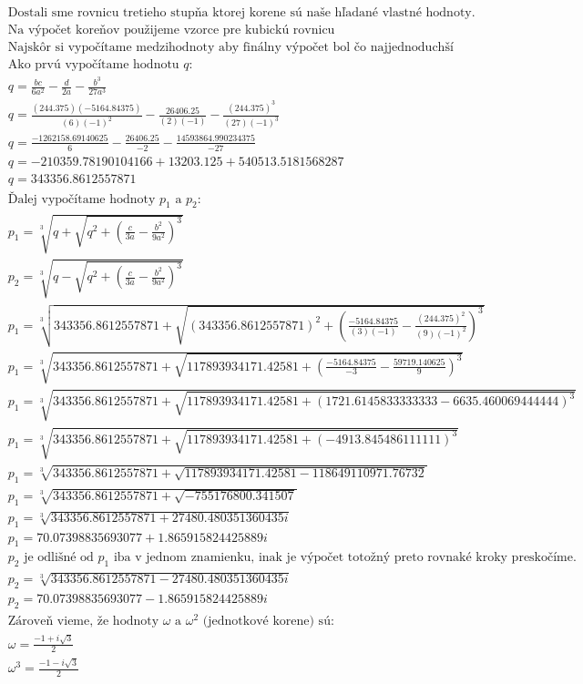 \documentclass[a4paper]{article}
\begin{document}
	\begin{align*}
		&\text{Dostali sme rovnicu tretieho stupňa ktorej korene sú naše hľadané vlastné hodnoty.}
		\\
		&\text{Na výpočet koreňov použijeme vzorce pre kubickú rovnicu}
		\\
		&\text{Najskôr si vypočítame medzihodnoty aby finálny výpočet bol čo najjednoduchší}
		\\
		&\text{Ako prvú vypočítame hodnotu $q$:}
		\\
		&q=\frac{bc}{6a^2}-\frac{d}{2a}-\frac{b^3}{27a^3}
		\\
		&q=\frac{(244.375)(-5164.84375)}{(6)(-1)^2}-\frac{26406.25}{(2)(-1)}-\frac{(244.375)^3}{(27)(-1)^3}
		\\
		&q=\frac{-1262158.69140625}{6}-\frac{26406.25}{-2}-\frac{14593864.990234375}{-27}
		\\
		&q=-210359.78190104166+13203.125+540513.5181568287
		\\
		&q=343356.8612557871
		\\
		&\text{Ďalej vypočítame hodnoty $p_1$ a $p_2$:}
		\\
		&p_1=\sqrt[3]{q+\sqrt{q^2+\left(\frac{c}{3a}-\frac{b^2}{9a^2}\right)^3}}
		\\
		&p_2=\sqrt[3]{q-\sqrt{q^2+\left(\frac{c}{3a}-\frac{b^2}{9a^2}\right)^3}}
		\\
		&p_1=\sqrt[3]{343356.8612557871+\sqrt{(343356.8612557871)^2+\left(\frac{-5164.84375}{(3)(-1)}-\frac{(244.375)^2}{(9)(-1)^2}\right)^3}}
		\\
		&p_1=\sqrt[3]{343356.8612557871+\sqrt{117893934171.42581+\left(\frac{-5164.84375}{-3}-\frac{59719.140625}{9}\right)^3}}
		\\
		&p_1=\sqrt[3]{343356.8612557871+\sqrt{117893934171.42581+\left(1721.6145833333333-6635.460069444444\right)^3}}
		\\
		&p_1=\sqrt[3]{343356.8612557871+\sqrt{117893934171.42581+\left(-4913.845486111111\right)^3}}
		\\
		&p_1=\sqrt[3]{343356.8612557871+\sqrt{117893934171.42581-118649110971.76732}}
		\\
		&p_1=\sqrt[3]{343356.8612557871+\sqrt{-755176800.341507}}
		\\
		&p_1=\sqrt[3]{343356.8612557871+27480.480351360435i}
		\\
		&p_1=70.07398835693077 +1.865915824425889i
		\\
		&\text{$p_2$ je odlišné od $p_1$ iba v jednom znamienku, inak je výpočet totožný preto rovnaké kroky preskočíme.}
		\\
		&p_2=\sqrt[3]{343356.8612557871-27480.480351360435i}
		\\
		&p_2=70.07398835693077 -1.865915824425889 i
		\\
		&\text{Zároveň vieme, že hodnoty $\omega$ a $\omega^2$ (jednotkové korene) sú:}
		\\
		&\omega=\frac{-1+i\sqrt{3}}{2}
		\\
		&\omega^3=\frac{-1-i\sqrt{3}}{2}
		\\
	\end{align*}
\end{document}
